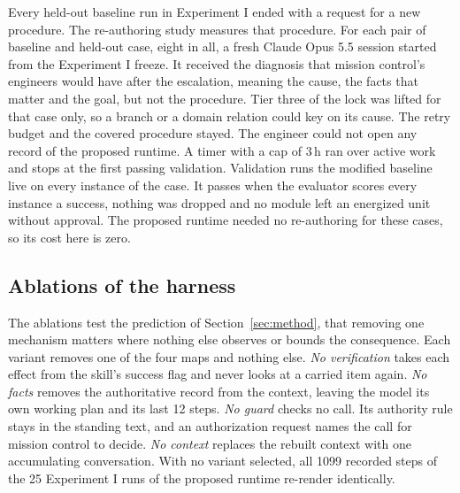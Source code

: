 Every held-out baseline run in Experiment I ended with a request for a new procedure. The re-authoring study measures
that procedure. For each pair of baseline and held-out case, eight in all, a fresh Claude Opus 5.5 session
started from the Experiment I freeze. It received the diagnosis that mission control's engineers would have after the
escalation, meaning the cause, the facts that matter and the goal, but not the procedure. Tier three of the lock was
lifted for that case only, so a branch or a domain relation could key on its cause. The retry budget and the covered
procedure stayed. The engineer could not open any record of the proposed runtime. A timer with a cap of 3\,h ran over
active work and stops at the first passing validation. Validation runs the modified baseline live on every instance of
the case. It passes when the evaluator scores every instance a success, nothing was dropped and no module left an
energized unit without approval. The proposed runtime needed no re-authoring for these cases, so its cost here is zero.

\subsection{Ablations of the harness}
\label{sec:setup-ablation}

The ablations test the prediction of Section~\ref{sec:method}, that removing one mechanism matters where nothing else
observes or bounds the consequence. Each variant removes one of the four maps and nothing else. \emph{No verification}
takes each effect from the skill's success flag and never looks at a carried item again. \emph{No facts} removes the
authoritative record from the context, leaving the model its own working plan and its last 12 steps. \emph{No guard}
checks no call. Its authority rule stays in the standing text, and an authorization request names the call for mission
control to decide. \emph{No context} replaces the rebuilt context with one accumulating conversation. With no variant
selected, all 1099 recorded steps of the 25 Experiment I runs of the proposed runtime re-render identically.

